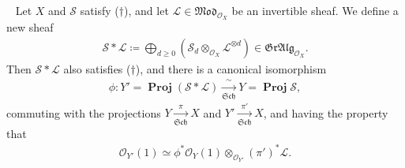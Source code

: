 \documentclass[11pt,a4paper,footinclude=true,headinclude=true]{scrbook} %
\DeclareMathOperator{\PROJ}{\mathbf{Proj}}
\newcommand{\LL}{\mathscr{L}}
\newcommand{\OO}{\mathcal{O}}
\newcommand{\Ss}{\mathscr{S}}
\newcommand{\Sch}{\mathfrak{Sch}}
\newcommand{\<}{\langle}
\newcommand{\>}{\rangle}
\newcommand{\GR}{\mathfrak{Gr}}
\newcommand{\MOD}{\mathfrak{Mod}}
\newcommand{\ALG}{\mathfrak{Alg}}
\newenvironment{lemma}[2][]
{\renewcommand\theinnercustomlemma{#2}\innercustomlemma[#1]
\begin{mdframed}[backgroundcolor=gray!20]\ }
{\end{mdframed}\endinnercustomprop}
\begin{document}
\begin{lemma}{7.9}
    Let $X$ and $\Ss$ satisfy ($\dagger$), and let $\LL\in\MOD_{\OO_X}$ be an invertible sheaf. We define a new sheaf
    \begin{align*}
        \Ss\ast\LL\coloneqq\bigoplus_{d\geq0}(\Ss_d\otimes_{\OO_X}\LL^{\otimes d})\in\GR\ALG_{\OO_X}.
    \end{align*}
    Then $\Ss\ast\LL$ also satisfies ($\dagger$), and there is a canonical isomorphism
    \begin{align*}
        \phi:Y'=\PROJ(\Ss\ast\LL)\xrightarrow[\Sch]{~~\sim~~}Y=\PROJ\Ss,
    \end{align*}
    commuting with the projections $Y\xrightarrow[\Sch]{\pi}X$ and $Y'\xrightarrow[\Sch]{\pi'}X$, and having the property that 
    \begin{align*}
        \OO_{Y'}(1)\simeq\phi^\ast\OO_Y(1)\otimes_{\OO_{Y'}}(\pi')^\ast\LL.
    \end{align*}
\end{lemma}
\end{document}
